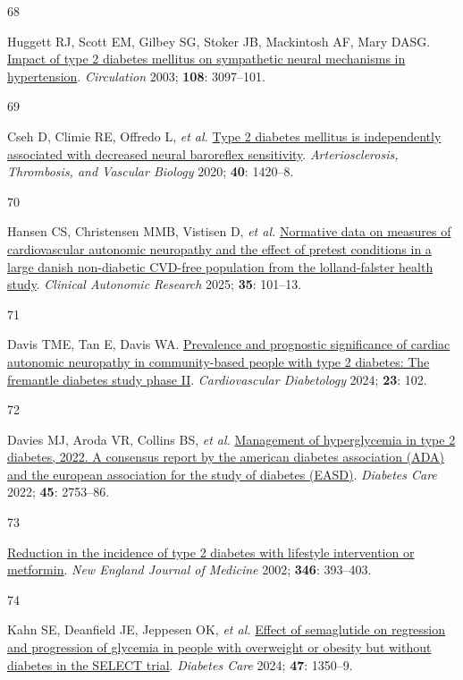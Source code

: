 \documentclass[
  letterpaper,
  headsepline=true,
  open=any]{scrbook}
\newlength{\cslhangindent}
\newlength{\csllabelwidth}
\newlength{\cslentryspacingunit} %
\newenvironment{CSLReferences}[2] %
 {%
  \setlength{\parindent}{0pt}
  \ifodd #1
  \let\oldpar\par
  \def\par{\hangindent=\cslhangindent\oldpar}
  \fi
  \setlength{\parskip}{#2\cslentryspacingunit}
 }%
 {}
\newcommand{\CSLLeftMargin}[1]{\parbox[t]{\csllabelwidth}{#1}}
\newcommand{\CSLRightInline}[1]{\parbox[t]{\linewidth - \csllabelwidth}{#1}\break}
\begin{document}
\begin{CSLReferences}{0}{0}
\leavevmode{}%
\CSLLeftMargin{68 }%
\CSLRightInline{Huggett RJ, Scott EM, Gilbey SG, Stoker JB, Mackintosh
AF, Mary DASG.
\href{https://doi.org/10.1161/01.CIR.0000103123.66264.FE}{Impact of type
2 diabetes mellitus on sympathetic neural mechanisms in hypertension}.
\emph{Circulation} 2003; \textbf{108}: 3097--101.}

\leavevmode{}%
\CSLLeftMargin{69 }%
\CSLRightInline{Cseh D, Climie RE, Offredo L, \emph{et al.}
\href{https://doi.org/10.1161/ATVBAHA.120.314102}{Type 2 diabetes
mellitus is independently associated with decreased neural baroreflex
sensitivity}. \emph{Arteriosclerosis, Thrombosis, and Vascular Biology}
2020; \textbf{40}: 1420--8.}

\leavevmode{}%
\CSLLeftMargin{70 }%
\CSLRightInline{Hansen CS, Christensen MMB, Vistisen D, \emph{et al.}
\href{https://doi.org/10.1007/s10286-024-01069-6}{Normative data on
measures of cardiovascular autonomic neuropathy and the effect of
pretest conditions in a large danish non-diabetic CVD-free population
from the lolland-falster health study}. \emph{Clinical Autonomic
Research} 2025; \textbf{35}: 101--13.}

\leavevmode{}%
\CSLLeftMargin{71 }%
\CSLRightInline{Davis TME, Tan E, Davis WA.
\href{https://doi.org/10.1186/s12933-024-02185-3}{Prevalence and
prognostic significance of cardiac autonomic neuropathy in
community-based people with type 2 diabetes: The fremantle diabetes
study phase II}. \emph{Cardiovascular Diabetology} 2024; \textbf{23}:
102.}

\leavevmode{}%
\CSLLeftMargin{72 }%
\CSLRightInline{Davies MJ, Aroda VR, Collins BS, \emph{et al.}
\href{https://doi.org/10.2337/dci22-0034}{Management of hyperglycemia in
type 2 diabetes, 2022. A consensus report by the american diabetes
association (ADA) and the european association for the study of diabetes
(EASD)}. \emph{Diabetes Care} 2022; \textbf{45}: 2753--86.}

\leavevmode{}%
\CSLLeftMargin{73 }%
\CSLRightInline{\href{https://doi.org/10.1056/NEJMoa012512}{Reduction in
the incidence of type 2 diabetes with lifestyle intervention or
metformin}. \emph{New England Journal of Medicine} 2002; \textbf{346}:
393--403.}

\leavevmode{}%
\CSLLeftMargin{74 }%
\CSLRightInline{Kahn SE, Deanfield JE, Jeppesen OK, \emph{et al.}
\href{https://doi.org/10.2337/dc24-0491}{Effect of semaglutide on
regression and progression of glycemia in people with overweight or
obesity but without diabetes in the SELECT trial}. \emph{Diabetes Care}
2024; \textbf{47}: 1350--9.}


\end{CSLReferences}
\end{document}
